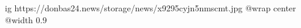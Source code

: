  
 
 
 
 

\ifcmt
  ig https://donbas24.news/storage/news/x9295cyjn5nmscmt.jpg
  @wrap center
  @width 0.9
\fi
